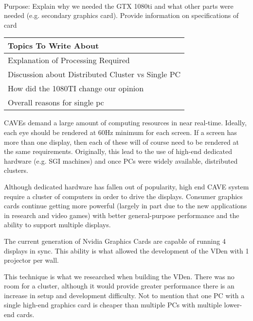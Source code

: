 \label{sec:hwComputerSection}\\
\begin{center}
	\textcolor{OliveGreen}{Purpose: Explain why we needed the GTX 1080ti and what other parts were needed (e.g. secondary graphics card). Provide information on specifications of card}
    
    \begin{table}[H]
        \centering
        \renewcommand\arraystretch{0.5}
        \begin{tabular}{|l|}
            \hline 
            Topics To Write About \\ 
            \hline 
            Explanation of Processing Required \\  
            Discussion about Distributed Cluster vs Single PC \\
            How did the 1080TI change our opinion  \\
            Overall reasons for single pc \\
            \hline 
        \end{tabular}
    \end{table}
\end{center}

CAVEs demand a large amount of computing resources in near real-time.  Ideally, each eye should be rendered at 60Hz minimum for each screen. If a screen has more than one display, then each of these will  of course need to be rendered at the same requirements. Originally, this lead to the use of high-end dedicated hardware (e.g. SGI machines) and once PCs were widely available, distributed clusters.

Although dedicated hardware has fallen out of popularity, high end CAVE system require a cluster of computers in order to drive the displays.  Consumer graphics cards continue getting more powerful (largely in part due to the new applications in research and video games) with better general-purpose performance and the ability to support multiple displays. 

The current generation of Nvidia Graphics Cards are capable of running 4 displays in sync. This ability is what allowed the development of the VDen with 1 projector per wall.

This technique is what we researched when building the VDen. There was no room for a cluster, although it would provide greater performance there is an increase in setup and development difficulty. Not to mention that one PC with a single high-end graphics card is cheaper than multiple PCs with multiple lower-end cards.




